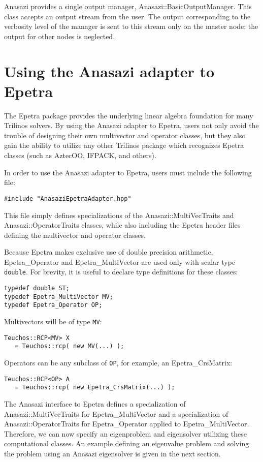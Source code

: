 Anasazi provides a single output manager, Anasazi::BasicOutputManager. This class accepts
an output stream from the user. The output corresponding to the verbosity level of the
manager is sent to this stream only on the master node; the output for other nodes is
neglected.

\section{Using the Anasazi adapter to Epetra}
\label{sec:anasazi:epetra}

The Epetra package provides the underlying linear algebra foundation for many
Trilinos solvers.  By using the Anasazi adapter to Epetra, users not only
avoid the trouble of designing their own multivector and operator classes, but
they also gain the ability to utilize any other Trilinos package which
recognizes Epetra classes (such as AztecOO, IFPACK, and others).

In order to use the Anasazi adapter to Epetra, users must include the following
file:
\begin{verbatim}
#include "AnasaziEpetraAdapter.hpp"
\end{verbatim}
This file simply defines specializations of the Anasazi::MultiVecTraits
and Anasazi::Operator\-Traits classes, while also including the Epetra
header files defining the multivector and operator classes.

Because Epetra makes exclusive use of double precision arithmetic, 
Epetra\_Operator and Epetra\_MultiVector are used only with 
scalar type \verb!double!. For brevity, it is useful to declare type definitions
for these classes:
\begin{verbatim}
typedef double ST;
typedef Epetra_MultiVector MV;
typedef Epetra_Operator OP;
\end{verbatim}

\noindent Multivectors will be of type \verb!MV!:
\begin{verbatim}
Teuchos::RCP<MV> X 
   = Teuchos::rcp( new MV(...) );
\end{verbatim}

\noindent Operators can be any subclass of \verb!OP!, for example, an Epetra\_CrsMatrix:
\begin{verbatim}
Teuchos::RCP<OP> A 
   = Teuchos::rcp( new Epetra_CrsMatrix(...) );
\end{verbatim}

The Anasazi interface to Epetra defines a specialization of
Anasazi::MultiVecTraits for Epetra\_MultiVector and a
specialization of Anasazi::OperatorTraits for Epetra\_Operator
applied to Epetra\_MultiVector. Therefore, we can now specify an
eigenproblem and eigensolver utilizing these computational classes. An example
defining an eigenvalue problem and solving the problem using an Anasazi
eigensolver is given in the next section.




